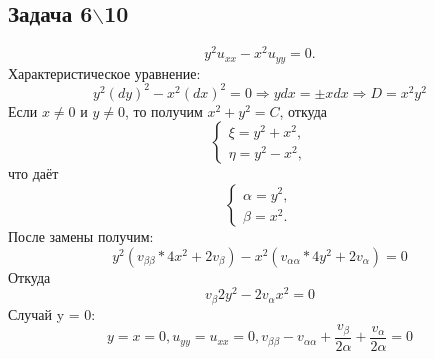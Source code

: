 \documentclass[11pt]{article}
\begin{document}
\subsection{Задача 6$\backslash$10}
\label{sec:org9eada99}
\begin{equation}
y^2u_{xx} - x^2u_{yy} = 0.
\end{equation}
Характеристическое уравнение:
\begin{equation}
y^2(dy)^2 - x^2(dx)^2 = 0 \Rightarrow ydx = \pm xdx \Rightarrow D = x^2y^2
\end{equation}
Если $x \neq 0$ и $y \neq 0$, то получим $x^2 + y^2 = C$, откуда
\begin{equation}
\begin{cases}
\xi = y^2 + x^2, \\
\eta = y^2 - x^2,
\end{cases}
\end{equation}
что даёт
\begin{equation}
\begin{cases}
\alpha = y^2, \\
\beta = x^2.
\end{cases}
\end{equation}
После замены получим:
\begin{equation}
y^2(v_{\beta\beta}*4x^2 + 2v_{\beta}) - x^2(v_{\alpha\alpha}*4y^2 + 2v_{\alpha}) = 0
\end{equation}
Откуда
\begin{equation}
v_{\beta}2y^2 - 2v_{\alpha}x^2 = 0
\end{equation}
Случай y = 0:
\begin{equation}
y = x = 0, u_{yy} = u_{xx} = 0, v_{\beta\beta} - v_{\alpha\alpha} + \frac{v_{\beta}}{2\alpha} + \frac{v_{\alpha}}{2\alpha} = 0
\end{equation}
\end{document}
